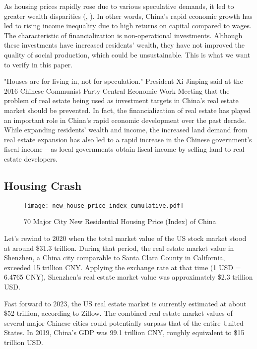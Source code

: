 \documentclass[12pt,english]{article}
\begin{document}
	As housing prices rapidly rose due to various speculative demands, it led to greater wealth disparities (\citealp{cao2018housing}, \citealp{zhou2016income}). In other words, China's rapid economic growth has led to rising income inequality due to high returns on capital compared to wages. The characteristic of financialization is non-operational investments. Although these investments have increased residents' wealth, they have not improved the quality of social production, which could be unsustainable. This is what we want to verify in this paper.
	
	"Houses are for living in, not for speculation." President Xi Jinping said at the 2016 Chinese Communist Party Central Economic Work Meeting that the problem of real estate being used as investment targets in China's real estate market should be prevented. In fact, the financialization of real estate has played an important role in China's rapid economic development over the past decade. While expanding residents' wealth and income, the increased land demand from real estate expansion has also led to a rapid increase in the Chinese government's fiscal income -- as local governments obtain fiscal income by selling land to real estate developers.
	\subsection{Housing Crash}
	\begin{figure}[htbp]
		\centering
		\texttt{[image: new\_house\_price\_index\_cumulative.pdf]}
		\caption{70 Major City New Residential Housing Price (Index) of China}
		\label{fig:1_3}
	\end{figure}
	Let's rewind to 2020 when the total market value of the US stock market stood at around \$31.3 trillion. During that period, the real estate market value in Shenzhen, a China city comparable to Santa Clara County in California, exceeded 15 trillion CNY. Applying the exchange rate at that time (1 USD = 6.4765 CNY), Shenzhen's real estate market value was approximately \$2.3 trillion USD.
	
	Fast forward to 2023, the US real estate market is currently estimated at about \$52 trillion, according to Zillow. The combined real estate market values of several major Chinese cities could potentially surpass that of the entire United States. In 2019, China's GDP was 99.1 trillion CNY, roughly equivalent to \$15 trillion USD.
	
\end{document}
